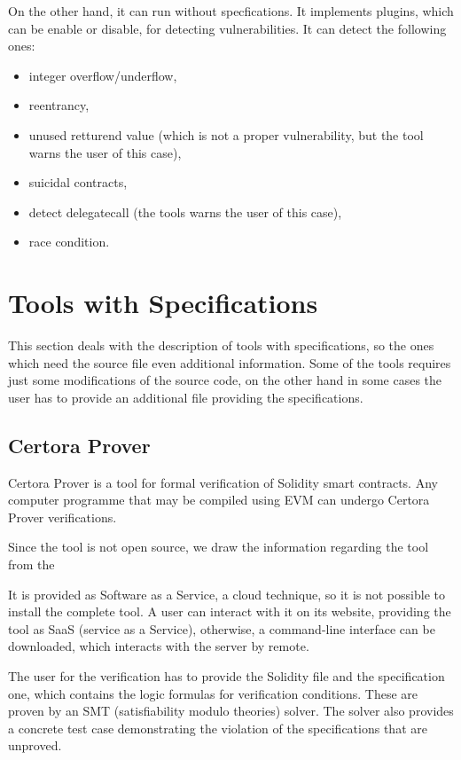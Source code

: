 On the other hand, it can run without specfications. It implements plugins, which can be enable or disable, for detecting vulnerabilities. 
It can detect the following ones:
\begin{itemize}
    \item integer overflow/underflow,
    \item reentrancy,
    \item unused retturend value (which is not a proper vulnerability, but the tool warns the user of this case),
    \item suicidal contracts,
    \item detect delegatecall (the tools warns the user of this case),
    \item race condition.
\end{itemize}

\section{Tools with Specifications}
\label{sec:Tools:Specification}
This section deals with the description of tools with specifications, so the ones which need the source file even additional information. 
Some of the tools requires just some modifications of the source code, on the other hand in some cases the user has to provide an additional file 
providing the specifications.

\subsection{Certora Prover}
\label{sec:Specification:Certora}
Certora Prover is a tool for formal verification of Solidity smart contracts. 
Any computer programme that may be compiled using EVM can undergo Certora Prover verifications. 

Since the tool is not open source, we draw the information regarding the tool from the 

It is provided as Software as a Service, a cloud technique, so it is not possible to install the complete tool. A user can interact with it on its 
website, providing the tool as SaaS (service as a Service), 
otherwise, a command-line interface can be downloaded, which interacts with the server by remote. 

The user for the verification has to provide the Solidity file and the specification one, which contains the logic formulas for verification conditions.
These are proven by an SMT (satisfiability modulo theories) solver. 
The solver also provides a concrete test case demonstrating the violation of the specifications that are unproved.

